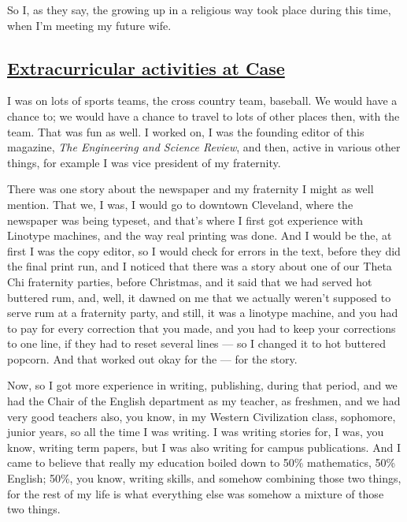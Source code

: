 \documentclass[]{article}
\begin{document}
So I, as they say, the growing up in a religious way took place during
this time, when I'm meeting my future wife.

\subsection{\texorpdfstring{\href{http://webofstories.com/play/17074}{Extracurricular
activities at
Case}}{Extracurricular activities at Case}}\label{extracurricular-activities-at-case}

I was on lots of sports teams, the cross country team, baseball. We
would have a chance to; we would have a chance to travel to lots of
other places then, with the team. That was fun as well. I worked on, I
was the founding editor of this magazine, \emph{The Engineering and
Science Review}, and then, active in various other things, for example I
was vice president of my fraternity.

There was one story about the newspaper and my fraternity I might as
well mention. That we, I was, I would go to downtown Cleveland, where
the newspaper was being typeset, and that's where I first got experience
with Linotype machines, and the way real printing was done. And I would
be the, at first I was the copy editor, so I would check for errors in
the text, before they did the final print run, and I noticed that there
was a story about one of our Theta Chi fraternity parties, before
Christmas, and it said that we had served hot buttered rum, and, well,
it dawned on me that we actually weren't supposed to serve rum at a
fraternity party, and still, it was a linotype machine, and you had to
pay for every correction that you made, and you had to keep your
corrections to one line, if they had to reset several lines --- so I
changed it to hot buttered popcorn. And that worked out okay for the ---
for the story.

Now, so I got more experience in writing, publishing, during that
period, and we had the Chair of the English department as my teacher, as
freshmen, and we had very good teachers also, you know, in my Western
Civilization class, sophomore, junior years, so all the time I was
writing. I was writing stories for, I was, you know, writing term
papers, but I was also writing for campus publications. And I came to
believe that really my education boiled down to 50\% mathematics, 50\%
English; 50\%, you know, writing skills, and somehow combining those two
things, for the rest of my life is what everything else was somehow a
mixture of those two things.
\end{document}
